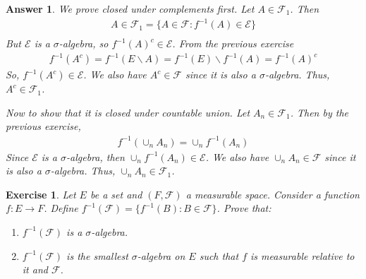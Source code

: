 \documentclass[12pt]{article}
\theoremstyle{colon}
\newtheorem{exercise}{Exercise}
\newtheorem*{answer}{Answer}
\begin{document}
\begin{answer}
  We prove closed under complements first. Let $A \in \mathcal{F}_1$. Then
  \begin{gather*}
    A \in \mathcal{F}_1 = \{ A \in \mathcal{F}: f^{-1}(A) \in \mathcal{E} \} \\
  \end{gather*}
  But $\mathcal{E}$ is a $\sigma$-algebra, so $f^{-1}(A)^c \in \mathcal{E}$. From the previous exercise
  \begin{gather*}
    f^{-1}(A^c) = f^{-1}(E \backslash A) = f^{-1}(E) \backslash f^{-1}(A) = f^{-1}(A)^c
  \end{gather*}
  So, $f^{-1}(A^c) \in \mathcal{E}$. We also have $A^c \in \mathcal{F}$ since it is also a $\sigma$-algebra. Thus, $A^c \in \mathcal{F}_1$.

  Now to show that it is closed under countable union. Let $A_n \in \mathcal{F}_1$. Then by the previous exercise,
  \begin{gather*}
    f^{-1}(\cup_n A_n) = \cup_n f^{-1}(A_n)
  \end{gather*}
  Since $\mathcal{E}$ is a $\sigma$-algebra, then $\cup_n f^{-1}(A_n) \in \mathcal{E}$. We also have $\cup_n A_n \in \mathcal{F}$ since it is also a $\sigma$-algebra. Thus, $\cup_n A_n \in \mathcal{F}_1$.
\end{answer}

\clearpage

\begin{exercise}
  Let $E$ be a set and $(F, \mathcal{F})$ a measurable space. Consider a function $f: E \rightarrow F$. Define $f^{-1}(\mathcal{F}) = \{ f^{-1}(B) : B \in \mathcal{F} \}$. Prove that:
  \begin{enumerate}[label=(\roman*)]
    \item $f^{-1}(\mathcal{F})$ is a $\sigma$-algebra.
    \item $f^{-1}(\mathcal{F})$ is the smallest $\sigma$-algebra on $E$ such that $f$ is measurable relative to it and $\mathcal{F}$.
  \end{enumerate}
\end{exercise}
\end{document}
